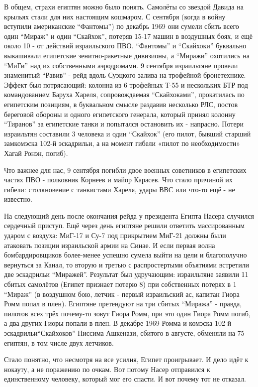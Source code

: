 В общем, страхи египтян можно было понять. Самолёты со звездой Давида на крыльях стали для них настоящим кошмаром. С сентября (когда в войну вступили американские “Фантомы”) по декабрь 1969 они сумели сбить всего один “Мираж” и один “Скайхок”, потеряв 15-17 машин в воздушных боях, и ещё около 10 - от действий израильского ПВО. “Фантомы” и “Скайхоки” буквально выкашивали египетские зенитно-ракетные дивизионы, а “Миражи” охотились на “МиГи” над их собственными аэродромами. 9 сентября израильтяне провели знаменитый “Равив” - рейд вдоль Суэцкого залива на трофейной бронетехнике. Эффект был потрясающий: колонна из 6 трофейных Т-55 и нескольких БТР под командованием Баруха Хареля, сопровождаемая “Скайхоками”, прокатилась по египетским позициям, в буквальном смысле раздавив несколько РЛС, постов береговой обороны и одного египетского генерала, который принял колонну “Тиранов” за египетские танки и попытался остановить их - напрасно. Потери израильтян составили 3 человека и один “Скайхок” (его пилот, бывший старший замкомэска 102-й эскадрильи, а на момент гибели «пилот по необходимости» Хагай Ронэн, погиб).

Что важнее для нас, 9 сентября погибли двое военных советников в египетских частях ПВО - полковник Корнеев и майор Карасев. Что стало причиной их гибели: столкновение с танкистами Хареля, удары ВВС или что-то ещё - не известно.

На следующий день после окончания рейда у президента Египта Насера случился сердечный приступ. Ещё через день египтяне решили ответить массированным ударом с воздуха: МиГ-17 и Су-7 под прикрытием МиГ-21 должны были атаковать позиции израильской армии на Синае. И если первая волна бомбардировщиков более-менее успешно сумела выйти на цели и благополучно вернуться за Канал, то вторую и третью с распростертыми объятиями встретили две эскадрильи “Миражей”. Результат был удручающим: израильтяне заявили 11 сбитых самолётов (Египет признает потерю 8) при собственных потерях в 1 “Мираж” (в воздушном бою, летчик - первый израильский ас, капитан Гиора Ромм попал в плен). Египтяне претендуют на три сбитых “Миража” - правда, пилотов всех трёх почему-то зовут Гиора Ромм, при это один Гиора Ромм погиб, а два других Гиоры попали в плен. В декабре 1969 Ромма и комэска 102-й эскадрильи“Скайхоков” Ниссима Ашкенази, сбитого в августе, обменяли на 75 египтян, в том числе двух летчиков.

Стало понятно, что несмотря на все усилия, Египет проигрывает. И дело идёт к нокауту, а не поражению по очкам. Вот потому Насер отправился к единственному человеку, который мог его спасти. И вот почему тот не отказал.

